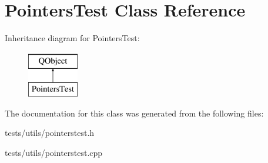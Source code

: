 \hypertarget{classPointersTest}{}\section{Pointers\+Test Class Reference}
\label{classPointersTest}
Inheritance diagram for Pointers\+Test\+:\begin{figure}[H]
\begin{center}
\leavevmode
\includegraphics[height=2.000000cm]{d8/d62/classPointersTest}
\end{center}
\end{figure}


The documentation for this class was generated from the following files\+:\begin{DoxyCompactItemize}
\item 
tests/utils/pointerstest.\+h\item 
tests/utils/pointerstest.\+cpp\end{DoxyCompactItemize}
